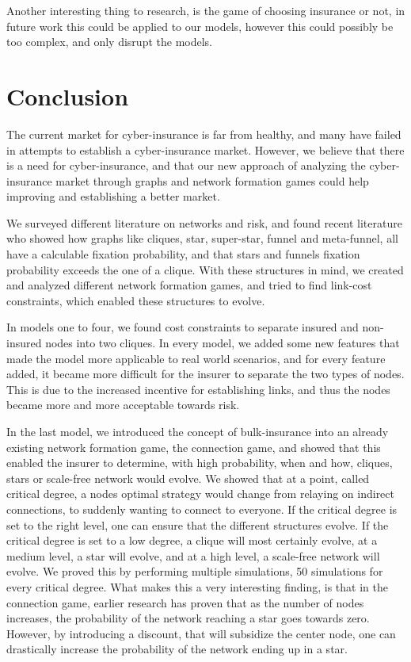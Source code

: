 Another interesting thing to research, is the game of choosing insurance or not, in future work this could be applied to our models, however this could possibly be too complex, and only disrupt the models.

\section{Conclusion}

The current market for cyber-insurance is far from healthy, and many have failed in attempts to establish a cyber-insurance market. However, we believe that there is a need for cyber-insurance, and that our new approach of analyzing the cyber-insurance market through graphs and network formation games could help improving and establishing a better market.  

We surveyed different literature on networks and risk, and found recent literature who showed how graphs like cliques, star, super-star, funnel and meta-funnel, all have a calculable fixation probability, and that stars and funnels fixation probability exceeds the one of a clique. 
With these structures in mind, we created and analyzed different network formation games, and tried to find link-cost constraints, which enabled these structures to evolve.

In models one to four, we found cost constraints to separate insured and non-insured nodes into two cliques. 
In every model, we added some new features that made the model more applicable to real world scenarios, and for every feature added, it became more difficult for the insurer to separate the two types of nodes. This is due to the increased incentive for establishing links, and thus the nodes became more and more acceptable towards risk. 


In the last model, we introduced the concept of bulk-insurance into an already existing network formation game, the connection game, and showed that this enabled the insurer to determine, with high probability, when and how, cliques, stars or scale-free network would evolve. We showed that at a point, called critical degree, a nodes optimal strategy would change from relaying on indirect connections, to suddenly wanting to connect to everyone. If the critical degree is set to the right level, one can ensure that the different structures evolve. If the critical degree is set to a low degree, a clique will most certainly evolve, at a medium level, a star will evolve, and at a high level, a scale-free network will evolve. We proved this by performing multiple simulations, 50 simulations for every critical degree.  
What makes this a very interesting finding, is that in the connection game, earlier research has proven that as the number of nodes increases, the probability of the network reaching a star goes towards zero. However, by introducing a discount, that will subsidize the center node, one can drastically increase the probability of the network ending up in a star.

